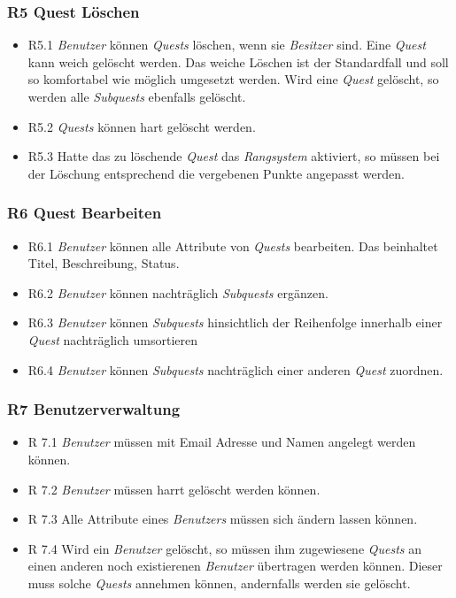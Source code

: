 \documentclass{article}
\begin{document}
\subsubsection{R5 Quest Löschen}

\begin{itemize}
	\item{R5.1} \textit{Benutzer} können \textit{Quests} löschen, wenn sie \textit{Besitzer} sind. Eine \textit{Quest} kann weich gelöscht werden. Das weiche Löschen ist der Standardfall und soll so komfortabel wie möglich umgesetzt werden. Wird eine  \textit{Quest}  gelöscht, so werden alle  \textit{Subquests} ebenfalls gelöscht.
	\item{R5.2} \textit{Quests} können hart gelöscht werden.
	\item{R5.3} Hatte das zu löschende \textit{Quest} das \textit{Rangsystem} aktiviert, so müssen bei der Löschung entsprechend die vergebenen Punkte angepasst werden.
\end{itemize}

\subsubsection{R6 Quest Bearbeiten}

\begin{itemize}
	\item{R6.1} \textit{Benutzer} können alle Attribute von \textit{Quests} bearbeiten. Das beinhaltet Titel, Beschreibung, Status.
	\item{R6.2} \textit{Benutzer} können nachträglich \textit{Subquests} ergänzen.
	\item{R6.3} \textit{Benutzer} können \textit{Subquests} hinsichtlich der Reihenfolge innerhalb einer \textit{Quest} nachträglich umsortieren
	\item{R6.4} \textit{Benutzer} können \textit{Subquests} nachträglich einer anderen \textit{Quest} zuordnen.
\end{itemize}

\subsubsection{R7 Benutzerverwaltung}
    \begin{itemize}
        \item{R 7.1} \textit{Benutzer} müssen mit Email Adresse und Namen angelegt werden können.
        \item{R 7.2} \textit{Benutzer} müssen harrt gelöscht werden können.
        \item{R 7.3} Alle Attribute eines \textit{Benutzers} müssen sich ändern lassen können.
        \item{R 7.4} Wird ein \textit{Benutzer} gelöscht, so müssen ihm zugewiesene \textit{Quests} an einen anderen noch existierenen \textit{Benutzer} übertragen werden können. Dieser muss solche \textit{Quests} annehmen können, andernfalls werden sie gelöscht. 
    \end{itemize}
\end{document}
